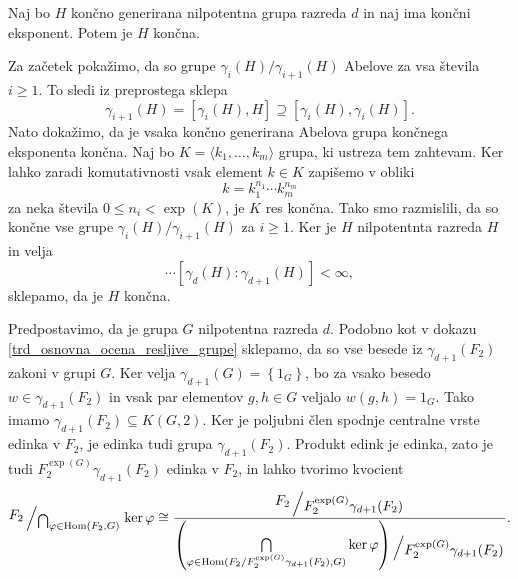 \begin{lema}
\label{lem_koncnogenerirana_nilpotentna}
Naj bo $H$ končno generirana nilpotentna grupa razreda $d$ in naj ima končni eksponent. Potem je $H$ končna.
\end{lema}
\begin{dokaz}
Za začetek pokažimo, da so grupe $\gamma_{i}(H) / \gamma_{i + 1}(H)$ Abelove za vsa števila $i \ge 1$. To sledi iz preprostega sklepa \begin{equation*}
\gamma_{i + 1}(H) = [\gamma_i(H), H] \supseteq [\gamma_i(H), \gamma_i(H)].
\end{equation*}
Nato dokažimo, da je vsaka končno generirana Abelova grupa končnega eksponenta končna. Naj bo $K = \langle k_1, \ldots, k_m \rangle$ grupa, ki ustreza tem zahtevam.
Ker lahko zaradi komutativnosti vsak element $k \in  K$ zapišemo v obliki \begin{equation*}
k = k_1^{n_1} \cdots k_m^{n_m}
\end{equation*}  
za neka števila $0 \le n_i < \exp(K)$, je $K$ res končna.
Tako smo razmislili, da so končne vse grupe $\gamma_{i}(H) / \gamma_{i + 1}(H)$ za $i \ge 1$. Ker je $H$ nilpotentnta razreda $H$ in velja \begin{equation*}
    [H : \gamma_2(H)] [\gamma_2(H) : \gamma_3(H)] \cdots [\gamma_{d}(H) : \gamma_{d + 1}(H)]  < \infty,
    \end{equation*}  
    sklepamo, da je $H$ končna.
\end{dokaz}

Predpostavimo, da je grupa $G$ nilpotentna razreda $d$. Podobno kot v dokazu \ref{trd_osnovna_ocena_resljive_grupe} sklepamo, da so vse besede iz $\gamma_{d+1}(F_2)$
zakoni v grupi $G$. Ker velja $\gamma_{d+1}(G) = \left\{ 1_G \right\}$, bo za vsako besedo $w \in \gamma_{d+1}(F_2)$ in vsak par elementov $g ,h \in G$ veljalo $w(g,h) = 1_{G}$.
Tako imamo $\gamma_{d+1}(F_2) \subseteq K(G, 2)$.
Ker je poljubni člen spodnje centralne vrste edinka v $F_2$, je edinka tudi grupa $\gamma_{d+ 1}(F_2)$.
Produkt edink je edinka, zato je tudi $F_2^{\exp(G)} \gamma_{d+ 1}(F_2)$ edinka v $F_2$, in lahko tvorimo kvocient 
\begin{equation*}
    \bigslant{F_2}{\bigcap_{\varphi \in \operatorname{Hom}(F_2, G)}}  \ker \varphi \cong \dfrac{\bigslant{F_2}{F_2^{\exp(G)}\gamma_{d+1}(F_2)}}{ \bigslant{ \left( \bigcap\limits_{\varphi \in \operatorname{Hom}({F_2} / {F_2^{\exp(G)}\gamma_{d+1}(F_2)}, G)} \ker \varphi \right) }{F_2^{\exp(G)}\gamma_{d+1}(F_2)}}.
\end{equation*}

